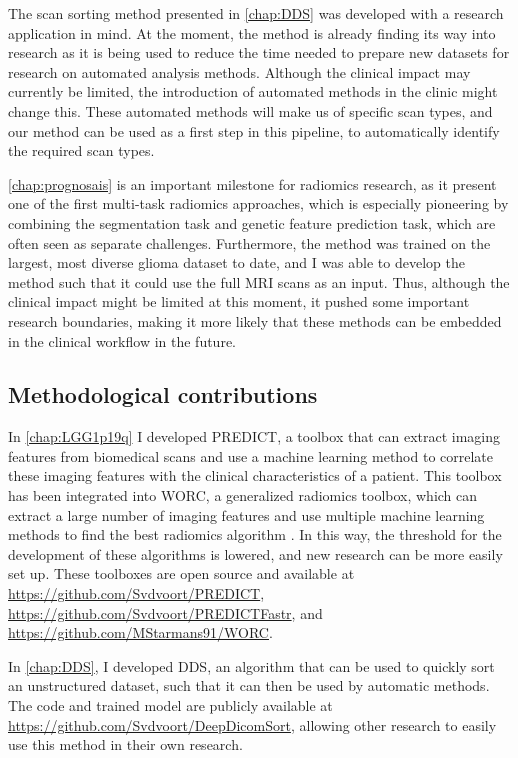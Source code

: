The scan sorting method presented in \cref{chap:DDS} was developed with a research application in mind.
At the moment, the method is already finding its way into research as it is being used to reduce the time needed to prepare new datasets for research on automated analysis methods.
Although the clinical impact may currently be limited, the introduction of automated methods in the clinic might change this.
These automated methods will make us of specific scan types, and our method can be used as a first step in this pipeline, to automatically identify the required scan types.

\cref{chap:prognosais} is an important milestone for radiomics research, as it present one of the first multi-task radiomics approaches, which is especially pioneering by combining the segmentation task and genetic feature prediction task, which are often seen as separate challenges.
Furthermore, the method was trained on the largest, most diverse glioma dataset to date, and I was able to develop the method such that it could use the full \gls{MRI} scans as an input.
Thus, although the clinical impact might be limited at this moment, it pushed some important research boundaries, making it more likely that these methods can be embedded in the clinical workflow in the future.


\subsection{Methodological contributions}
In \cref{chap:LGG1p19q} I developed PREDICT, a toolbox that can extract imaging features from biomedical scans and use a machine learning method to correlate these imaging features with the clinical characteristics of a patient.
This toolbox has been integrated into WORC, a generalized radiomics toolbox, which can extract a large number of imaging features and use multiple machine learning methods to find the best radiomics algorithm \autocite{mstarmans2020worc}.
In this way, the threshold for the development of these algorithms is lowered, and new research can be more easily set up.
These toolboxes are open source and available at \url{https://github.com/Svdvoort/PREDICT}, \url{https://github.com/Svdvoort/PREDICTFastr}, and \url{https://github.com/MStarmans91/WORC}.

In \cref{chap:DDS}, I developed \acrlong{DDS}, an algorithm that can be used to quickly sort an unstructured dataset, such that it can then be used by automatic methods.
The code and trained model are publicly available at \url{https://github.com/Svdvoort/DeepDicomSort}, allowing other research to easily use this method in their own research.


